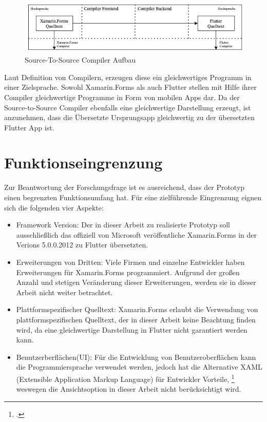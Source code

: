 \begin{figure}[!ht]
 \includegraphics[width=14.5cm]{Images/CompilerArchitecture/S2SArchitecture.png}
 \caption{Source-To-Source Compiler Aufbau}
 \label{fig:S2SCompilerAufbau}
\end{figure}

Laut Definition von Compilern,  erzeugen diese ein gleichwertiges Programm in einer Zielsprache.  Sowohl Xamarin.Forms als auch Flutter stellen mit Hilfe ihrer Compiler gleichwertige Programme in Form von mobilen Apps dar.  Da der Source-to-Source Compiler ebenfalls eine gleichwertige Darstellung erzeugt, ist anzunehmen, dass die Übersetzte Ursprungsapp gleichwertig zu der übersetzten Flutter App ist. 

\section{Funktionseingrenzung}
Zur Beantwortung der Forschungsfrage ist es ausreichend, dass der Prototyp einen begrenzten Funktionsumfang hat.  Für eine zielführende Eingrenzung eignen sich die folgenden vier Aspekte:

\begin{itemize}
\setlength\itemsep{-0.6em}
 \item Framework Version: Der in dieser Arbeit zu realisierte Prototyp soll ausschließlich das offiziell von Microsoft veröffentliche Xamarin.Forms in der Verions 5.0.0.2012 zu Flutter übersetzten.  
 \item Erweiterungen von Dritten: Viele Firmen und einzelne Entwickler haben Erweiterungen für Xamarin.Forms programmiert.  Aufgrund der großen Anzahl und stetigen Veränderung dieser Erweiterungen, werden sie in dieser Arbeit nicht weiter betrachtet.  
 \item Plattformspezifischer Quelltext: Xamarin.Forms erlaubt die Verwendung von plattformspezifischen Quelltext,  der in dieser Arbeit keine Beachtung finden wird, da eine gleichwertige Darstellung in Flutter nicht garantiert werden kann. 
  \item Benutzerberflächen(UI): Für die Entwicklung von Benutzeroberflächen kann die Programmiersprache \Csharp  verwendet werden,  jedoch hat die Alternative XAML  (Extensible Application Markup Language) für Entwickler Vorteile, \footcite[Vgl.][Abgerufen am \today]{MicrosoftXAML2017} weswegen die \Csharp  Ansichtsoption in dieser Arbeit nicht berücksichtigt wird.  
\end{itemize}

